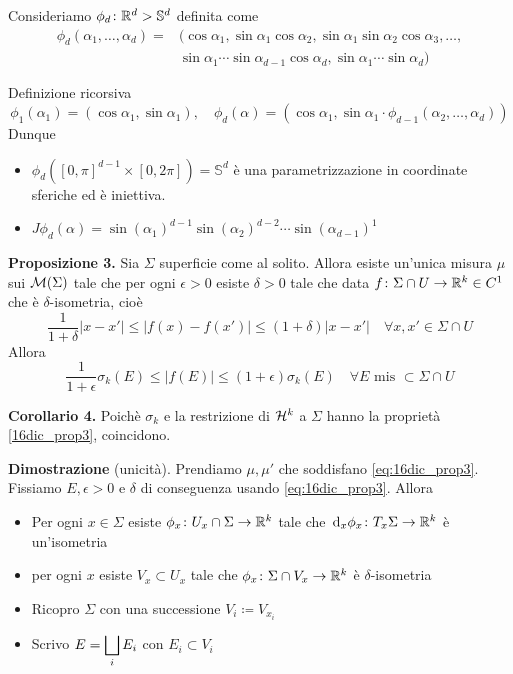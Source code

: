 Consideriamo $\phi_d \colon \mathbb R^d > \mathbb{S}^d$ definita come 
%
\begin{align*}
	\phi_d(\alpha_1,\ldots,\alpha_d) = & ( \cos \alpha_1, \sin \alpha_1 \cos \alpha_2, \sin \alpha_1 \sin \alpha_2 \cos \alpha_3,\ldots, \\
	& \sin \alpha_1 \cdots \sin \alpha_{d-1} \cos \alpha_d, \sin \alpha_1 \cdots \sin \alpha_d ) 
\end{align*}

Definizione ricorsiva
%
$$
\phi_1 (\alpha_1) = (\cos \alpha_1, \sin \alpha_1), \quad 
\phi_d(\alpha) = (\cos \alpha_1, \sin \alpha_1 \cdot \phi_{d-1}(\alpha_2,\ldots,\alpha_d))
$$
%
Dunque 
\begin{itemize}

	\item $\phi_d \left( [0,\pi]^{d-1} \times [0,2\pi] \right) = \mathbb{S}^d$ è una parametrizzazione in coordinate sferiche ed è iniettiva.

	\item $J\phi_d(\alpha) = \sin(\alpha_1)^{d-1} \sin(\alpha_2)^{d-2} \cdots \sin(\alpha_{d-1})^1$

\end{itemize}


\textbf{Proposizione 3.} Sia $\Sigma$ superficie come al solito. Allora esiste un'unica misura $\mu$ sui $\mathcal{M}(\Sigma)$ tale che per ogni $\epsilon > 0$ esiste $\delta > 0$ tale che data $f \colon \Sigma \cap U \to \mathbb R^k \in C^1$ che è $\delta$-isometria, cioè
%
\begin{equation}
	\label{16dic_prop3} \tag{P}
	\frac{1}{1 + \delta} |x-x'| \leq |f(x) - f(x')| \leq (1+\delta)|x-x'| \quad \forall x,x' \in \Sigma \cap U
\end{equation}
Allora
%
$$
	\frac{1}{1+\epsilon} \sigma_k(E) \leq |f(E)| \leq (1+\epsilon)\sigma_k(E) \quad \forall E \text{ mis } \subset \Sigma \cap U
$$
%

\textbf{Corollario 4.} Poichè $\sigma_k$ e la restrizione di $\mathcal{H}^k$ a $\Sigma$ hanno la proprietà \eqref{16dic_prop3}, coincidono.

\textbf{Dimostrazione} (unicità). 
Prendiamo $\mu,\mu'$ che soddisfano \eqref{eq:16dic_prop3}.
Fissiamo $E,\epsilon > 0$ e $\delta$ di conseguenza usando \eqref{eq:16dic_prop3}. Allora
\begin{itemize}

	\item Per ogni $x \in \Sigma$ esiste $\phi_x \colon U_x \cap \Sigma \to \mathbb R^k$ tale che $\,\mathrm{d}_x \phi_x \colon T_x \Sigma \to \mathbb R^k$ è un'isometria


	\item per ogni $x$ esiste $V_x \subset U_x$ tale che $\phi_x \colon \Sigma \cap V_x \to \mathbb R^k$ è $\delta$-isometria


	\item Ricopro $\Sigma$ con una successione $V_i \coloneqq V_{x_i}$


	\item Scrivo $\displaystyle E = \bigsqcup_i E_i$ con $E_i \subset V_i$

\end{itemize}
 
